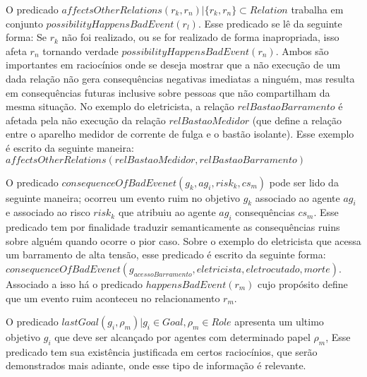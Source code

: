 O predicado $affectsOtherRelations(r_k,r_n) | \{ r_k, r_n\} \subset Relation $ trabalha em conjunto $possibilityHappensBadEvent(r_l)$. Esse predicado se lê da seguinte forma: Se $r_k$ não foi realizado, ou se for realizado de forma inapropriada, isso afeta  $r_n$ tornando verdade $possibilityHappensBadEvent(r_n)$. Ambos são importantes em raciocínios onde se deseja mostrar que a não execução de um dada relação não gera consequências negativas imediatas a ninguém, mas resulta em consequências futuras inclusive sobre pessoas que não compartilham da mesma situação. No exemplo do eletricista, a relação $relBastaoBarramento$ é afetada pela não execução da relação $relBastaoMedidor$ (que define a relação entre o aparelho medidor de corrente de fulga e o bastão isolante). Esse exemplo é escrito da seguinte maneira:$affectsOtherRelations(relBastaoMedidor,relBastaoBarramento)$

O predicado $consequenceOfBadEvenet(g_k, ag_i,risk_k,cs_m)$ pode ser lido da seguinte maneira; ocorreu um evento ruim no objetivo $g_k$ associado ao agente $ag_i$ e associado ao risco $risk_k$ que atribuiu ao agente $ag_i$ consequências $cs_m$. Esse predicado tem por finalidade traduzir semanticamente as consequências ruins sobre alguém quando ocorre o pior caso. Sobre o exemplo do eletricista que acessa um barramento de alta tensão, esse predicado é escrito da seguinte forma: $consequenceOfBadEvenet(g_{acessoBarramento}, eletricista,eletrocutado,morte)$. Associado a isso há o predicado $happensBadEvent(r_m)$ cujo propósito define que um evento ruim aconteceu no relacionamento $r_m$.

O predicado $lastGoal(g_i,\rho_m) | g_i \in Goal, \rho_m \in Role $ apresenta um ultimo objetivo $g_i$ que deve ser alcançado por agentes com determinado papel $\rho_m$, Esse predicado tem sua existência justificada em certos raciocínios, que serão demonstrados mais adiante, onde esse tipo de informação é relevante.